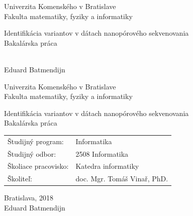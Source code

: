 \documentclass[12pt, oneside]{book}
\theoremstyle{definition}
\theoremstyle{remark}
\def\mfrok{2018}
\def\mfnazov{Identifikácia variantov v dátach nanopórového sekvenovania}
\def\mftyp{Bakalárska práca}
\def\mfautor{Eduard Batmendijn}
\def\mfskolitel{doc. Mgr. Tomáš Vinař, PhD.}
\def\mfmiesto{Bratislava, \mfrok}
\def\mfodbor{2508 Informatika}
\def\program{ Informatika }
\def\mfpracovisko{ Katedra informatiky }
\begin{document}
     
\frontmatter


\thispagestyle{empty}

\begin{center}
\sc\large
Univerzita Komenského v Bratislave\\
Fakulta matematiky, fyziky a informatiky

\vfill

{\LARGE\mfnazov}\\
\mftyp
\end{center}

\vfill

{\sc\large 
\noindent \mfrok\\
\mfautor
}

\eject %


\thispagestyle{empty}
\noindent

\begin{center}
\sc  
\large
Univerzita Komenského v Bratislave\\
Fakulta matematiky, fyziky a informatiky

\vfill

{\LARGE\mfnazov}\\
\mftyp
\end{center}

\vfill

\noindent
\begin{tabular}{ll}
Študijný program: & \program \\
Študijný odbor: & \mfodbor \\
Školiace pracovisko: & \mfpracovisko \\
Školiteľ: & \mfskolitel \\
\end{tabular}

\vfill


\noindent \mfmiesto\\
\mfautor

\eject %




\end{document}
